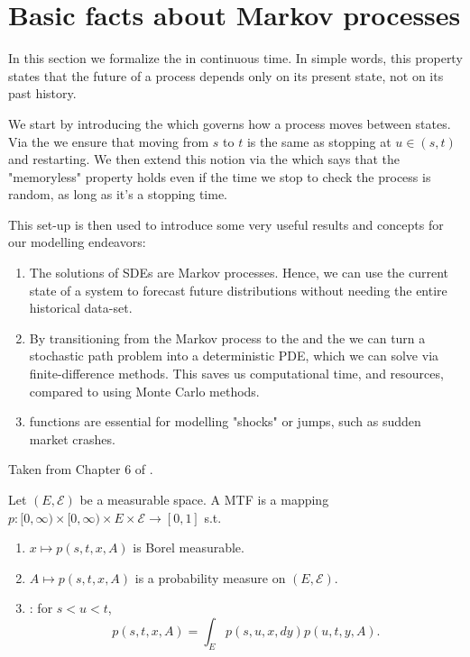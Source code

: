 \section{Basic facts about Markov processes}

\begin{intermission}
    In this section we formalize the  in continuous time.
    In simple words, this property states that the future of a process 
    depends only on its present state, not on its past history. 

    We start by introducing the  which
    governs how a process moves between states. Via the 
     we ensure that moving from $s$ 
    to $t$ is the same as stopping at $u \in (s,t)$ and restarting.
    We then extend this notion via the  
    which says that the "memoryless" property holds even if the time 
    we stop to check the process is random, as long as it's a stopping time. 

    This set-up is then used to introduce some very useful results
    and concepts for our modelling endeavors:

    \begin{enumerate}
        \item The solutions of SDEs are Markov processes. Hence, we
    can use the current state of a system to forecast future 
    distributions without needing the entire historical data-set.
    \item By transitioning from the Markov process to the 
     and the 
    we can turn a stochastic path problem into a deterministic 
    PDE, which we can solve via finite-difference methods. 
    This saves us computational time, and resources, compared to  
    using Monte Carlo methods.
    \item {} functions are essential for modelling 
    "shocks" or jumps, such as sudden market crashes.
    \end{enumerate}
   
\end{intermission}

Taken from Chapter 6 of \cite{baldi2017stochastic}.

\begin{definition}
    Let $(E, \mathcal{E})$ be a measurable space. A MTF is a mapping $p: [0, \infty) \times [0, \infty) \times E \times \mathcal{E} \to [0,1]$ s.t.
    \begin{enumerate}
        \item $x \mapsto p(s,t,x,A)$ is Borel measurable.
        \item $A \mapsto p(s,t,x,A)$ is a probability measure on $(E, \mathcal{E})$.
        \item {}: for $s < u < t$,
        $$p(s,t,x,A) = \int_E p(s,u,x,dy)p(u,t,y,A).$$
    \end{enumerate}
\end{definition}

